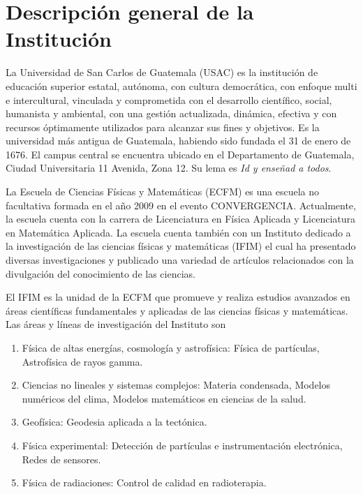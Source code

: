 \documentclass[titlepage,11pt]{article}
\begin{document}
\pagestyle{empty}
\setcounter{page}{0}

%

\newpage
\pagestyle{plain}


%
\section{Descripción general de la Institución}
\label{sec:institucion}
La Universidad de San Carlos de Guatemala (USAC) es la institución de
educación superior estatal, autónoma, con cultura democrática, con enfoque
multi e intercultural, vinculada y comprometida con el desarrollo científico,
social, humanista y ambiental, con una gestión actualizada, dinámica, efectiva
y con recursos óptimamente utilizados para alcanzar sus fines y objetivos. Es
la universidad más antigua de Guatemala, habiendo sido fundada el 31 de enero
de 1676. El campus central se encuentra ubicado en el Departamento de
Guatemala, Ciudad Universitaria 11 Avenida, Zona 12. Su lema es \emph{Id y
  enseñad a todos}.

La Escuela de Ciencias Físicas y Matemáticas (ECFM) es una escuela no
facultativa formada en el año 2009 en el evento CONVERGENCIA. Actualmente, la
escuela cuenta con la carrera de Licenciatura en Física Aplicada y
Licenciatura en Matemática Aplicada. La escuela cuenta también con un
Instituto dedicado a la investigación de las ciencias físicas y matemáticas
(IFIM) el cual ha presentado diversas investigaciones y publicado una variedad
de artículos relacionados con la divulgación del conocimiento de las ciencias.

El IFIM es la unidad de la ECFM que promueve y realiza estudios avanzados en
áreas científicas fundamentales y aplicadas de las ciencias físicas y
matemáticas.  Las áreas y líneas de investigación del Instituto son
\begin{enumerate}
\item Física de altas energías, cosmología y astrofísica: Física de
  partículas, Astrofísica de rayos gamma.
\item Ciencias no lineales y sistemas complejos: Materia condensada, Modelos
  numéricos del clima, Modelos matemáticos en ciencias de la salud.
\item Geofísica: Geodesia aplicada a la tectónica.  
\item Física experimental: Detección de partículas e instrumentación
  electrónica, Redes de sensores.  
\item Física de radiaciones: Control de calidad en radioterapia.  
\end{enumerate}
\end{document}
